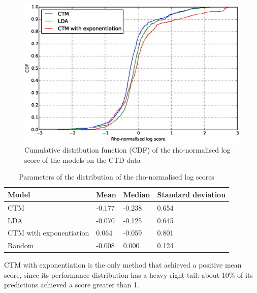 \documentclass[12pt,a4paper,twoside,openright]{report}
\begin{document}
\begin{figure}[!htb]
\includegraphics[width=\textwidth]{ctd-rho-cdf.eps}
\caption{Cumulative distribution function (CDF) of the rho-normalised log score of the models on the CTD data}
\label{fig:ctd-rho-cdf}
\end{figure}

\begin{table}
\centering
\begin{tabular}{| l | l | l | l |}
\hline
Model & Mean & Median & Standard deviation\\
\hline
CTM & -0.177 & -0.238 & 0.654 \\
LDA & -0.070 & -0.125 & 0.645 \\
CTM with exponentiation & 0.064 & -0.059 & 0.801 \\
Random & -0.008 & 0.000 & 0.124 \\
\hline
\end{tabular}
\caption{Parameters of the distribution of the rho-normalised log scores}
\label{tab:ctm-cdf-summary}
\end{table}

CTM with exponentiation is the only method that achieved a positive mean score, since its performance distribution has a heavy right tail: about 10\% of its predictions achieved a score greater than 1.
%
\end{document}
